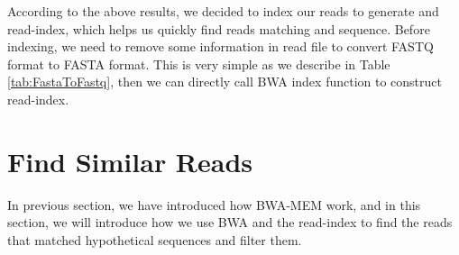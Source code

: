 According to the above results, we decided to index our reads to generate and read-index, which helps us quickly find reads matching and sequence. Before indexing, we need to remove some information in read file to convert FASTQ format to FASTA format. This is very simple as we describe in Table \ref{tab:FastaToFastq}, then we can directly call BWA index function to construct read-index.

\begin{table}[ht]
\caption{The difference between FASTQ and FASTA format}
\label{tab:FastaToFastq}
\end{table}

\section{Find Similar Reads}
In previous section, we have introduced how BWA-MEM work, and in this section, we will introduce how we use BWA and the read-index to find the reads that matched hypothetical sequences and filter them.

